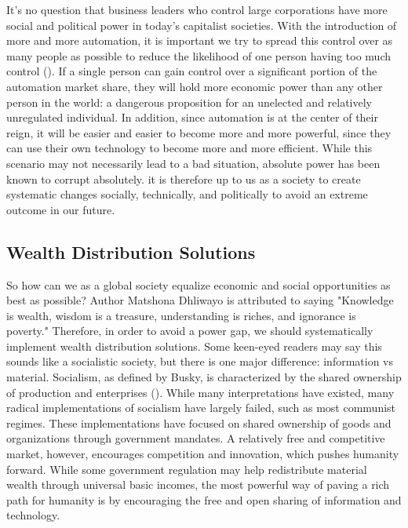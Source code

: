 It's no question that business leaders who control large corporations have more social and political power in today's capitalist societies. With the introduction of more and more automation, it is important we try to spread this control over as many people as possible to reduce the likelihood of one person having too much control (\cite{WhatsWrongWithWealthDistribution}). If a single person can gain control over a significant portion of the automation market share, they will hold more economic power than any other person in the world: a dangerous proposition for an unelected and relatively unregulated individual. In addition, since automation is at the center of their reign, it will be easier and easier to become more and more powerful, since they can use their own technology to become more and more efficient. While this scenario may not necessarily lead to a bad situation, absolute power has been known to corrupt absolutely. it is therefore up to us as a society to create systematic changes socially, technically, and politically to avoid an extreme outcome in our future.

\subsection{Wealth Distribution Solutions}

So how can we as a global society equalize economic and social opportunities as best as possible? Author Matshona Dhliwayo is attributed to saying "Knowledge is wealth, wisdom is a treasure, understanding is riches, and ignorance is poverty." Therefore, in order to avoid a power gap, we should systematically implement wealth distribution solutions. Some keen-eyed readers may say this sounds like a socialistic society, but there is one major difference: information vs material. Socialism, as defined by Busky, is characterized by the shared ownership of production and enterprises (\cite{WhatIsSocialism}). While many interpretations have existed, many radical implementations of socialism have largely failed, such as most communist regimes. These implementations have focused on shared ownership of goods and organizations through government mandates. A relatively free and competitive market, however, encourages competition and innovation, which pushes humanity forward. While some government regulation may help redistribute material wealth through universal basic incomes, the most powerful way of paving a rich path for humanity is by encouraging the free and open sharing of information and technology.

